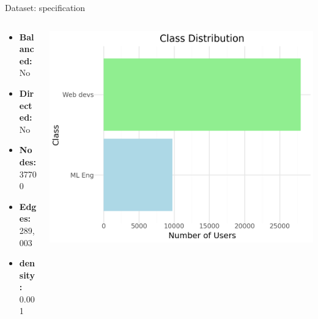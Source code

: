 \begin{frame}{Dataset: specification}
\begin{columns}
    \begin{column}{0.4\textwidth}
        \begin{itemize}
            \item \textbf{Balanced:} No 
            \item \textbf{Directed:} No 
            \item \textbf{Nodes:} 37700
            \item \textbf{Edges:} 289,003
            \item \textbf{density:} 0.001
        \end{itemize}
        
    \end{column}
    \begin{column}{0.6\textwidth}
        \includegraphics[width=1\textwidth]{images/imbalanced.png}
    \end{column}
\end{columns}
\end{frame}